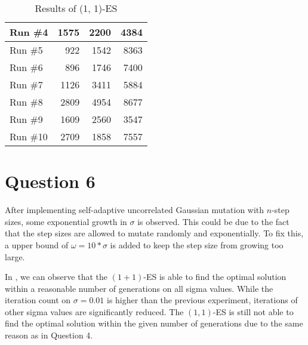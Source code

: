 \documentclass[12pt,letterpaper]{article}
\begin{document}
\begin{table}[H]
{\begin{tabular}{l|r|r|r}
            Run \#4  & 1575     & 2200    & 4384    \\ \hline
            Run \#5  & 922      & 1542    & 8363    \\ \hline
            Run \#6  & 896      & 1746    & 7400    \\ \hline
            Run \#7  & 1126     & 3411    & 5884    \\ \hline
            Run \#8  & 2809     & 4954    & 8677    \\ \hline
            Run \#9  & 1609     & 2560    & 3547    \\ \hline
            Run \#10 & 2709     & 1858    & 7557    \\
        \end{tabular}
        \caption{Results of (1, 1)-ES}
        \label{tab:5b}
    }
\end{table}
\section*{Question 6}
After implementing self-adaptive uncorrelated Gaussian mutation with $n$-step sizes,  some exponential growth in $\sigma$ is observed. This could be due to the fact that the step sizes are allowed to mutate randomly and exponentially.
To fix this, a upper bound of $\omega = 10*\sigma$ is added to keep the step size from growing too large.


In , we can observe that the $(1+1)$-ES is able to find the optimal solution within a reasonable number of generations on all sigma values. While the iteration count on $\sigma = 0.01$ is higher than the previous experiment, iterations of other sigma values are significantly reduced. The $(1, 1)$-ES is still not able to find the optimal solution within the given number of generations due to the same reason as in Question 4.
\end{document}
